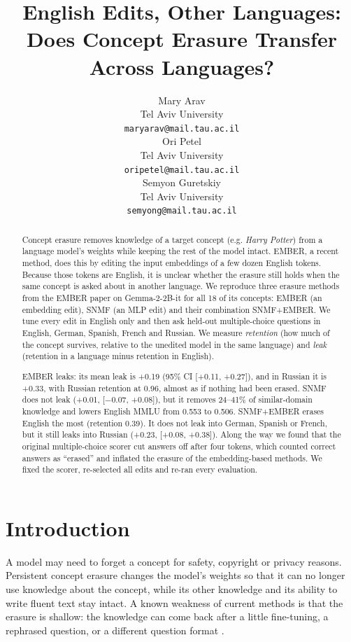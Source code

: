 \documentclass[11pt]{article}
\title{English Edits, Other Languages:\\
Does Concept Erasure Transfer Across Languages?}
\author{Mary Arav \\
  Tel Aviv University \\
  \texttt{maryarav@mail.tau.ac.il} \\\And
  Ori Petel \\
  Tel Aviv University \\
  \texttt{oripetel@mail.tau.ac.il} \\\And
  Semyon Guretskiy \\
  Tel Aviv University \\
  \texttt{semyong@mail.tau.ac.il} \\}
\begin{document}
\maketitle

\begin{abstract}
Concept erasure removes knowledge of a target concept (e.g. \emph{Harry Potter}) from a language model's weights while keeping the rest of the model intact. EMBER, a recent method, does this by editing the input embeddings of a few dozen English tokens. Because those tokens are English, it is unclear whether the erasure still holds when the same concept is asked about in another language. We reproduce three erasure methods from the EMBER paper on Gemma-2-2B-it for all 18 of its concepts: EMBER (an embedding edit), SNMF (an MLP edit) and their combination SNMF+EMBER. We tune every edit in English only and then ask held-out multiple-choice questions in English, German, Spanish, French and Russian. We measure \emph{retention} (how much of the concept survives, relative to the unedited model in the same language) and \emph{leak} (retention in a language minus retention in English).

EMBER leaks: its mean leak is +0.19 (95\% CI [+0.11, +0.27]), and in Russian it is +0.33, with Russian retention at 0.96, almost as if nothing had been erased. SNMF does not leak (+0.01, [$-$0.07, +0.08]), but it removes 24--41\% of similar-domain knowledge and lowers English MMLU from 0.553 to 0.506. SNMF+EMBER erases English the most (retention 0.39). It does not leak into German, Spanish or French, but it still leaks into Russian (+0.23, [+0.08, +0.38]). Along the way we found that the original multiple-choice scorer cut answers off after four tokens, which counted correct answers as ``erased'' and inflated the erasure of the embedding-based methods. We fixed the scorer, re-selected all edits and re-ran every evaluation.
\end{abstract}

\section{Introduction}\label{sec:1}

A model may need to forget a concept for safety, copyright or privacy reasons. Persistent concept erasure changes the model's weights so that it can no longer use knowledge about the concept, while its other knowledge and its ability to write fluent text stay intact. A known weakness of current methods is that the erasure is shallow: the knowledge can come back after a little fine-tuning, a rephrased question, or a different question format \citep{deeb2024unlearning,lynch2024eight,hong2025intrinsic,ye2025formindependent}.
\end{document}
